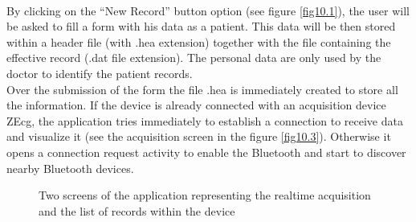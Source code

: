 \\By clicking on the “New Record” button option (see figure \ref{fig10.1}), the user will be asked to fill a form with his data as a patient. This data will be then stored within a header file (with .hea extension)  together with the file containing the effective record (.dat file extension). The personal data are only used by the doctor to identify the patient records.\\
Over the submission of the form the file .hea is immediately created to store all the information. If the device is already connected with an acquisition device ZEcg, the application tries immediately to establish a connection to receive data and visualize it (see the acquisition screen in the figure \ref{fig10.3}). Otherwise it opens a connection request activity to enable the Bluetooth and start to discover nearby Bluetooth devices.\\
\begin{figure}[!htb]
	\centering
	\qquad
	\caption{Two screens of the application representing the realtime acquisition and the list of records within the device}  
	\label{fig10.3ab}
\end{figure}
